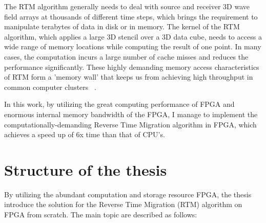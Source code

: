 The RTM algorithm generally needs to deal with source and receiver
3D wave field arrays at thousands of different time steps, which brings
the requirement to manipulate terabytes of data in disk or in memory.
The kernel of the RTM algorithm, which applies a large 3D stencil
over a 3D data cube, needs to access a wide range of memory locations
while computing the result of one point. In many cases, the computation
incurs a large number of cache misses and reduces the performance
significantly. These highly demanding memory access characteristics
of RTM form a 'memory wall' that keeps us from achieving high throughput
in common computer clusters ~\cite{fu11}.

In this work, by utilizing the great computing performance of FPGA
and enormous internal memory bandwidth of the FPGA, I manage to implement
the computationally-demanding Reverse Time Migration algorithm in
FPGA, which achieves a speed up of 6x time than that of CPU's.

\section{Structure of the thesis}

By utilizing the abundant computation and storage resource FPGA, the thesis
introduce the solution for the Reverse Time Migration (RTM) algorithm on
FPGA from scratch. The main topic are described as follows:

